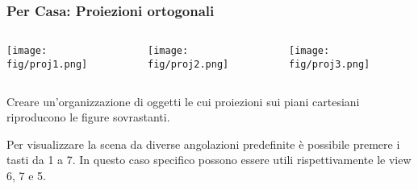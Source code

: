 \documentclass{beamer}
\newcommand{\fig}{figures}
\begin{document}
\begin{frame}
\frametitle{Per Casa: Proiezioni ortogonali}
\begin{columns}
\begin{column}{0.32\textwidth}
\texttt{[image: \\fig/proj1.png]}
\end{column}
\begin{column}{0.32\textwidth}
\texttt{[image: \\fig/proj2.png]}
\end{column}
\begin{column}{0.32\textwidth}
\texttt{[image: \\fig/proj3.png]}
\end{column}
\end{columns}
\vspace{20pt}
Creare un'organizzazione di oggetti le cui proiezioni sui piani cartesiani riproducono le figure sovrastanti.
    \vspace {0.5cm}

Per visualizzare la scena da diverse angolazioni predefinite \`e possibile premere i tasti da 1 a 7.
In questo caso specifico possono essere utili rispettivamente le view 6, 7 e 5.
\end{frame}
\end{document}
